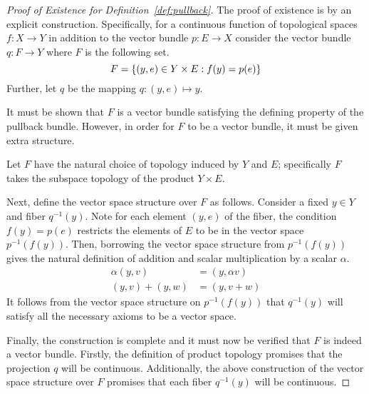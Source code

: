 \documentclass[../../sean_thesis.tex]{subfiles}
\begin{document}

\begin{proof}[Proof of Existence for Definition~\ref{def:pullback}]

The proof of existence is by an explicit construction. Specifically, for a continuous function of topological spaces $f: X \to Y$ in addition to the vector bundle $p: E \to X$ consider the vector bundle $q: F \to Y$ where $F$ is the following set.
\begin{equation*}
	F = \left\{(y,e) \in Y \times E: f(y) = p(e)\right\}
\end{equation*}	
Further, let $q$ be the mapping $q: (y,e) \mapsto y$.

It must be shown that $F$ is a vector bundle satisfying the defining property of the pullback bundle. However, in order for $F$ to be a vector bundle, it must be given extra structure. 

Let $F$ have the natural choice of topology induced by $Y$ and $E$; specifically $F$ takes the subspace topology of the product $Y \times E$.

Next, define the vector space structure over $F$ as follows. Consider a fixed $y \in Y$ and fiber $q^{-1}(y)$. Note for each element $(y,e)$ of the fiber, the condition $f(y) = p(e)$ restricts the elements of $E$ to be in the vector space $p^{-1}(f(y))$. Then, borrowing the vector space structure from $p^{-1}(f(y))$ gives the  natural definition of addition and scalar multiplication by a scalar $\alpha$.
\begin{align*}
	\alpha (y,v) &= (y,\alpha v)\\
	(y,v) + (y,w) &= (y,v+w)
\end{align*}
It follows from the vector space structure on $p^{-1}(f(y))$ that $q^{-1}(y)$ will satisfy all the necessary axioms to be a vector space.

Finally, the construction is complete and it must now be verified that $F$ is indeed a vector bundle. Firstly,  the definition of product topology promises that the projection $q$ will be continuous. Additionally, the above construction of the vector space structure over $F$ promises that each fiber $q^{-1}(y)$ will be continuous.


\end{proof}
\end{document}
